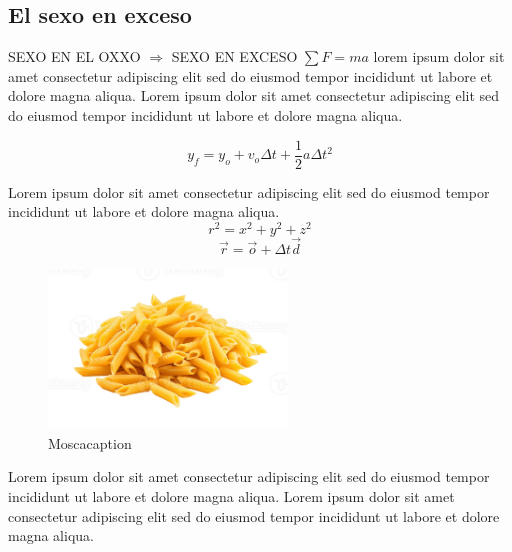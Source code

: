 \documentclass{report}
\begin{document}
	\subsection{El sexo en exceso}	
		SEXO EN EL OXXO $\Rightarrow$ SEXO EN EXCESO $\sum F = ma$
		lorem ipsum dolor sit amet consectetur adipiscing elit sed do eiusmod tempor incididunt ut labore et dolore magna aliqua. 
		Lorem ipsum dolor sit amet consectetur adipiscing elit sed do eiusmod tempor incididunt ut labore et dolore magna aliqua. 

		\begin{equation}
			y_f = y_o + v_o\Delta t + \frac{1}{2}a\Delta t^2
		\end{equation}

		\begin{tcolorbox}[colback=red!5!white, colframe=red!75!black, title=El sexo en el Oxxo-tracing]
            Lorem ipsum dolor sit amet consectetur adipiscing elit sed do eiusmod tempor incididunt ut labore et dolore magna aliqua.
			\begin{equation}
				r^2 = x^2 + y^2 + z^2
            \end{equation}
			\begin{equation}
				\vec{r} = \vec{o} + \Delta t\vec{d} 
            \end{equation}
        \end{tcolorbox}

		\begin{figure}[H]
            \centering
            \includegraphics[width=2.5in]{mosca.png}
            \caption{Moscacaption}
            \label{fig:Moscalable}
        \end{figure}

		Lorem ipsum dolor sit amet consectetur adipiscing elit sed do eiusmod tempor incididunt ut labore et dolore magna aliqua. 
		Lorem ipsum dolor sit amet consectetur adipiscing elit sed do eiusmod tempor incididunt ut labore et dolore magna aliqua. 

\newpage
\end{document}
